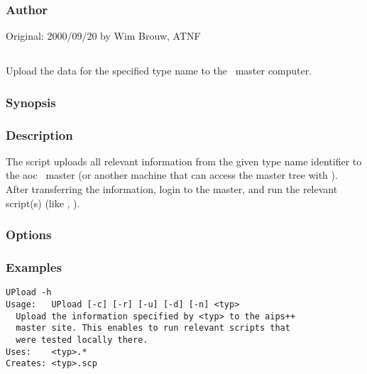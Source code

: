 \subsubsection*{Author}

Original: 2000/09/20 by Wim Brouw, ATNF


\newpage

\subsection{}
\label{UPload}

Upload the data for the specified type name to the \aipspp\ master computer.

\subsubsection*{Synopsis}

\begin{synopsis}
\end{synopsis}

\subsubsection*{Description}

\noindent
The  script uploads all relevant information from the given type
name identifier to the aoc \aipspp\ master (or another machine that can
access the master tree with ).\\
After transferring the information, login to the master, and run the relevant
script(s) (like , ).

\subsubsection*{Options}

\subsubsection*{Examples}

\begin{verbatim}
UPload -h
Usage:   UPload [-c] [-r] [-u] [-d] [-n] <typ>
  Upload the information specified by <typ> to the aips++ 
  master site. This enables to run relevant scripts that
  were tested locally there.
Uses:    <typ>.*
Creates: <typ>.scp
\end{verbatim}

